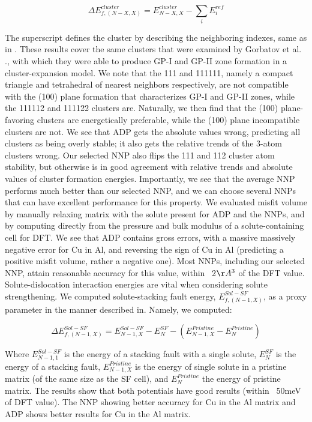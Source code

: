 \documentclass{article}
\begin{document}
\begin{equation}
\Delta E^{cluster}_{f,(N-X,X)} = E^{cluster}_{N-X,X} - \sum_i E^{ref}_i
\end{equation}

The superscript defines the cluster by describing the neighboring indexes, same as in \cite{Gorbatov2019EffectiveAlloys}.
These results cover the same clusters that were examined by Gorbatov et al. .\cite{Gorbatov2019EffectiveAlloys}, with which they were able to produce GP-I and GP-II zone formation in a cluster-expansion model.
We note that the 111 and 111111, namely a compact triangle and tetrahedral of nearest neighbors respectively, are not compatible with the (100) plane formation that characterizes GP-I and GP-II zones, while the 111112 and 111122 clusters are.
Naturally, we then find that the (100) plane-favoring clusters are energetically preferable, while the (100) plane incompatible clusters are not.
We see that ADP gets the absolute values wrong, predicting all clusters as being overly stable; it also gets the relative trends of the 3-atom clusters wrong.
Our selected NNP also flips the 111 and 112 cluster atom stability, but otherwise is in good agreement with relative trends and absolute values of cluster formation energies.
Importantly, we see that the average NNP performs much better than our selected NNP, and we can choose several NNPs that can have excellent performance for this property. 
We evaluated misfit volume by manually relaxing matrix with the solute present for ADP and the NNPs, and by computing directly from the pressure and bulk modulus of a solute-containing cell for DFT.
We see that ADP contains gross errors, with a massive massively negative error for Cu in Al, and reversing the sign of Cu in Al (predicting a positive misfit volume, rather a negative one).
Most NNPs, including our selected NNP, attain reasonable accuracy for this value, within ~2$\AA^3$ of the DFT value. 
Solute-dislocation interaction energies are vital when considering solute strengthening\cite{Leyson2010}.
We computed solute-stacking fault energy, $E^{Sol-SF}_{f,(N-1,X)}$, as a proxy parameter in the manner described in\cite{Yin2017a}.
Namely, we computed:

\begin{equation}
\Delta E^{Sol-SF}_{f,(N-1,X)} = E^{Sol-SF}_{N-1,X} - E^{SF}_{N} - (E^{Pristine}_{N-1,X}-E^{Pristine}_{N})
\end{equation}

Where $E^{Sol-SF}_{N-1,1}$ is the energy of a stacking fault with a single solute,
$E^{SF}_{N}$ is the energy of a stacking fault,
$E^{Pristine}_{N-1,X}$ is the energy of single solute in a pristine matrix (of the same size as the SF cell), 
and $E^{Pristine}_{N}$ the energy of pristine matrix. 
The results show that both potentials have good results (within ~50meV of DFT value).
The NNP showing better accuracy for Cu in the Al matrix and ADP shows better results for Cu in the Al matrix.
\end{document}

